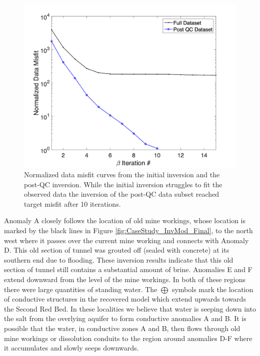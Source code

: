 \documentclass[final,authoryear,5p,times,twocolumn]{elsarticle}
\begin{document}
\begin{figure} [!ht]
\label{fig:CaseStudy_InvMod}
\end{figure}

\begin{figure} [!ht]
	\begin{center}
	\includegraphics[trim=1.3cm 0.2cm 2.6cm 1.2cm, clip=true,width=0.75\linewidth]{./Figures/Fig18.png}
	\end{center}
\caption{Normalized data misfit curves from the initial inversion and the post-QC inversion. While the initial inversion struggles to fit the observed data the inversion of the post-QC data subset reached target misfit after 10 iterations.}
\label{fig:CaseStudy_Inv_MisfitPlots}
\end{figure}

Anomaly A closely follows the location of old mine workings, whose location is marked by the black lines in Figure \ref{fig:CaseStudy_InvMod_Final}, to the north west where it passes over the current mine working and connects with Anomaly D. This old section of tunnel was grouted off (sealed with concrete) at its southern end due to flooding. These inversion results indicate that this old section of tunnel still contains a substantial amount of brine. Anomalies E and F extend downward from the level of the mine workings. In both of these regions there were large quantities of standing water. The $\bigoplus$ symbols mark the location of conductive structures in the recovered model which extend upwards towards the Second Red Bed. In these localities we believe that water is seeping down into the salt from the overlying aquifer to form conductive anomalies A and B. It is possible that the water, in conductive zones A and B, then flows through old mine workings or dissolution conduits to the region around anomalies D-F where it accumulates and slowly seeps downwards.
\end{document}
